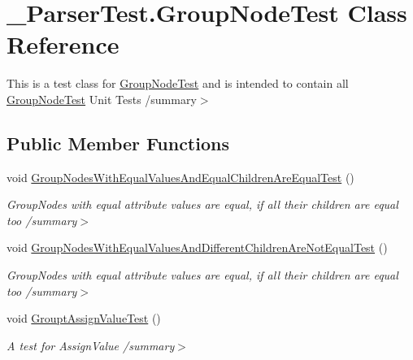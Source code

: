 \hypertarget{class__1920_parser_test_1_1_group_node_test}{}\section{\+\_\+Parser\+Test.\+Group\+Node\+Test Class Reference}
\label{class__1920_parser_test_1_1_group_node_test}


This is a test class for \hyperlink{class__1920_parser_test_1_1_group_node_test}{Group\+Node\+Test} and is intended to contain all \hyperlink{class__1920_parser_test_1_1_group_node_test}{Group\+Node\+Test} Unit Tests /summary$>$  


\subsection*{Public Member Functions}
\begin{DoxyCompactItemize}
\item 
void \hyperlink{class__1920_parser_test_1_1_group_node_test_a2cb1adf10d46b843dbbc1fe4691cde4a}{Group\+Nodes\+With\+Equal\+Values\+And\+Equal\+Children\+Are\+Equal\+Test} ()\hypertarget{class__1920_parser_test_1_1_group_node_test_a2cb1adf10d46b843dbbc1fe4691cde4a}{}\label{class__1920_parser_test_1_1_group_node_test_a2cb1adf10d46b843dbbc1fe4691cde4a}

\begin{DoxyCompactList}\small\item\em Group\+Nodes with equal attribute values are equal, if all their children are equal too /summary$>$ \end{DoxyCompactList}\item 
void \hyperlink{class__1920_parser_test_1_1_group_node_test_a871e698fdbcb73b2564ac6cb48ca8031}{Group\+Nodes\+With\+Equal\+Values\+And\+Different\+Children\+Are\+Not\+Equal\+Test} ()\hypertarget{class__1920_parser_test_1_1_group_node_test_a871e698fdbcb73b2564ac6cb48ca8031}{}\label{class__1920_parser_test_1_1_group_node_test_a871e698fdbcb73b2564ac6cb48ca8031}

\begin{DoxyCompactList}\small\item\em Group\+Nodes with equal attribute values are equal, if all their children are equal too /summary$>$ \end{DoxyCompactList}\item 
void \hyperlink{class__1920_parser_test_1_1_group_node_test_a9ae167ae89a66c97c605a1d99c4e9169}{Groupt\+Assign\+Value\+Test} ()\hypertarget{class__1920_parser_test_1_1_group_node_test_a9ae167ae89a66c97c605a1d99c4e9169}{}\label{class__1920_parser_test_1_1_group_node_test_a9ae167ae89a66c97c605a1d99c4e9169}

\begin{DoxyCompactList}\small\item\em A test for Assign\+Value /summary$>$ \end{DoxyCompactList}\end{DoxyCompactItemize}
